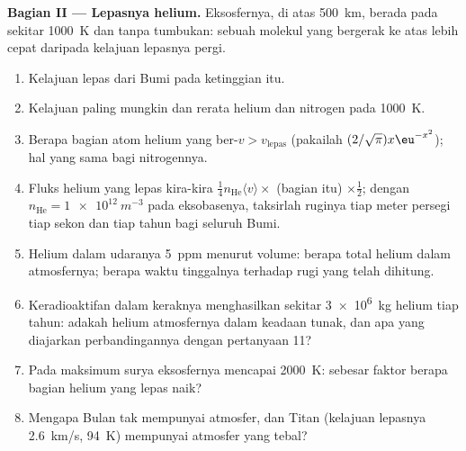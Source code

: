 \begin{problem}
\textbf{Bagian II --- Lepasnya helium.}
Eksosfernya, di atas \qty{500}{km}, berada pada sekitar \qty{1000}{K} dan
tanpa tumbukan: sebuah molekul yang bergerak ke atas lebih cepat daripada kelajuan lepasnya
pergi.
\begin{enumerate}[resume]
  \item Kelajuan lepas dari Bumi pada ketinggian itu.
  \item Kelajuan paling mungkin dan rerata helium dan nitrogen pada
        \qty{1000}{K}.
  \item Berapa bagian atom helium yang ber-$v > v_{\text{lepas}}$ (pakailah
        $(2/\sqrt\pi)x\eu^{-x^2}$); hal yang sama bagi nitrogennya.
  \item Fluks helium yang lepas kira-kira $\tfrac14n_{\text{He}}\langle
        v\rangle \times$ (bagian itu) $\times\tfrac12$; dengan $n_{\text{He}}
        = \qty{1e12}{m^{-3}}$ pada eksobasenya, taksirlah ruginya tiap meter
        persegi tiap sekon dan tiap tahun bagi seluruh Bumi.
  \item Helium dalam udaranya \qty{5}{ppm} menurut volume: berapa total helium dalam
        atmosfernya; berapa waktu tinggalnya terhadap rugi yang telah dihitung.
  \item Keradioaktifan dalam keraknya menghasilkan sekitar \qty{3e6}{kg} helium
        tiap tahun: adakah helium atmosfernya dalam keadaan tunak, dan apa
        yang diajarkan perbandingannya dengan pertanyaan 11?
  \item Pada maksimum surya eksosfernya mencapai \qty{2000}{K}: sebesar faktor
        berapa bagian helium yang lepas naik?
  \item Mengapa Bulan tak mempunyai atmosfer, dan Titan (kelajuan lepasnya
        \qty{2.6}{km/s}, \qty{94}{K}) mempunyai atmosfer yang tebal?
\end{enumerate}


\end{problem}
